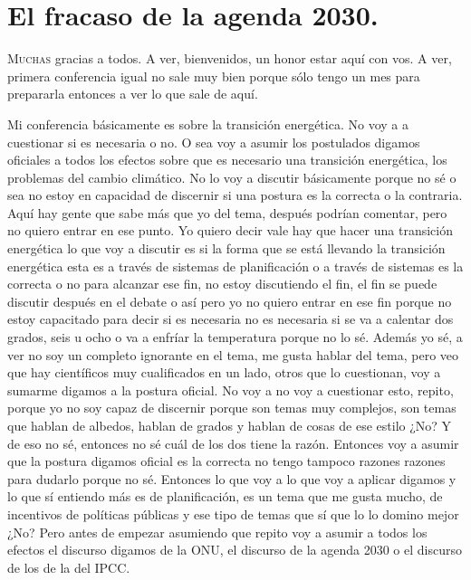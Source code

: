 \chapter{El fracaso de la agenda 2030.}


\lettrine[lines=2, findent=3pt, nindent=0pt]{M}{uchas} gracias a todos. A ver, bienvenidos, un honor estar aquí con vos. A ver, primera conferencia igual no sale muy bien porque sólo tengo un mes para prepararla entonces a ver lo que sale de aquí.

Mi conferencia básicamente es sobre la transición energética. No voy a a cuestionar si es necesaria o no. O sea voy a asumir los postulados digamos oficiales a todos los efectos sobre que es necesario una transición energética, los problemas del cambio climático. No lo voy a discutir básicamente porque no sé o sea no estoy en capacidad de discernir si una postura es la correcta o la contraria. Aquí hay gente que sabe más que yo del tema, después podrían comentar, pero no quiero entrar en ese punto. Yo quiero decir vale hay que hacer una transición energética lo que voy a discutir es si la forma que se está llevando la transición energética esta es a través de sistemas de planificación o a través de sistemas es la correcta o no para alcanzar ese fin, no estoy discutiendo el fin, el fin se puede discutir después en el debate o así pero yo no quiero entrar en ese fin porque no estoy capacitado para decir si es necesaria no es necesaria si se va a calentar dos grados, seis u ocho o va a enfríar la temperatura porque no lo sé. Además yo sé, a ver no soy un completo ignorante en el tema, me gusta hablar del tema, pero veo que hay científicos muy cualificados en un lado, otros que lo cuestionan, voy a sumarme digamos a la postura oficial. No voy a no voy a cuestionar esto, repito, porque yo no soy capaz de discernir porque son temas muy complejos, son temas que hablan de albedos, hablan de grados y hablan de cosas de ese estilo ¿No? Y de eso no sé, entonces no sé cuál de los dos tiene la razón. Entonces voy a asumir que la postura digamos oficial es la correcta no tengo tampoco razones razones para dudarlo porque no sé. Entonces lo que voy a lo que voy a aplicar digamos y lo que sí entiendo más es de planificación, es un tema que me gusta mucho, de incentivos de políticas públicas y ese tipo de temas que sí que lo lo domino mejor ¿No? Pero antes de empezar asumiendo que repito voy a asumir a todos los efectos el discurso digamos de la ONU, el discurso de la agenda 2030 o el discurso de los de la del IPCC.

